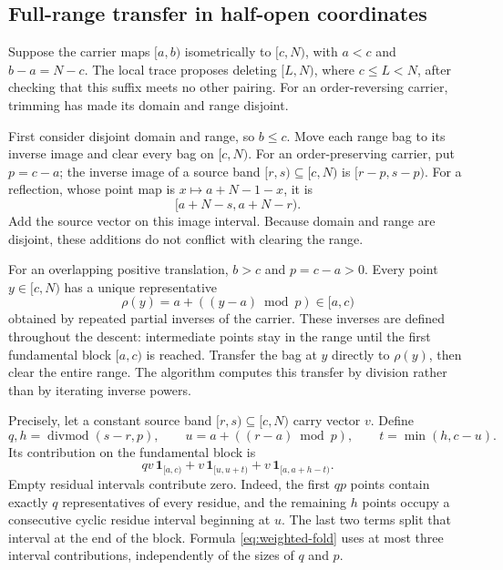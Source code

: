 \subsection{Full-range transfer in half-open coordinates}
\label{sec:weighted-transfer}

Suppose the carrier maps $[a,b)$ isometrically to $[c,N)$, with $a<c$ and
$b-a=N-c$.  The local trace proposes deleting $[L,N)$, where
$c\leq L<N$, after checking that this suffix meets no other pairing.  For
an order-reversing carrier, trimming has made its domain and range disjoint.

First consider disjoint domain and range, so $b\leq c$.  Move each range bag
to its inverse image and clear every bag on $[c,N)$.  For an
order-preserving carrier, put $p=c-a$; the inverse image of a source band
$[r,s)\subseteq[c,N)$ is $[r-p,s-p)$.  For a reflection, whose point map is
$x\mapsto a+N-1-x$, it is
\begin{equation}
\label{eq:weighted-reflection}
 [a+N-s,a+N-r).
\end{equation}
Add the source vector on this image interval.  Because domain and range are
disjoint, these additions do not conflict with clearing the range.

For an overlapping positive translation, $b>c$ and $p=c-a>0$.  Every point
$y\in[c,N)$ has a unique representative
\begin{equation}
\label{eq:weighted-residue}
 \rho(y)=a+((y-a)\bmod p)\in[a,c)
\end{equation}
obtained by repeated partial inverses of the carrier.  These inverses are
defined throughout the descent: intermediate points stay in the range until
the first fundamental block $[a,c)$ is reached.  Transfer the bag at $y$
directly to $\rho(y)$, then clear the entire range.  The algorithm computes
this transfer by division rather than by iterating inverse powers.

Precisely, let a constant source band $[r,s)\subseteq[c,N)$ carry vector $v$.
Define
\[
 q,h=\operatorname{divmod}(s-r,p),\qquad
 u=a+((r-a)\bmod p),\qquad
 t=\min(h,c-u).
\]
Its contribution on the fundamental block is
\begin{equation}
\label{eq:weighted-fold}
 qv\,\mathbf1_{[a,c)}
 +v\,\mathbf1_{[u,u+t)}
 +v\,\mathbf1_{[a,a+h-t)}.
\end{equation}
Empty residual intervals contribute zero.  Indeed, the first $qp$ points
contain exactly $q$ representatives of every residue, and the remaining $h$
points occupy a consecutive cyclic residue interval beginning at $u$.  The
last two terms split that interval at the end of the block.  Formula
\eqref{eq:weighted-fold} uses at most three interval contributions,
independently of the sizes of $q$ and $p$.

